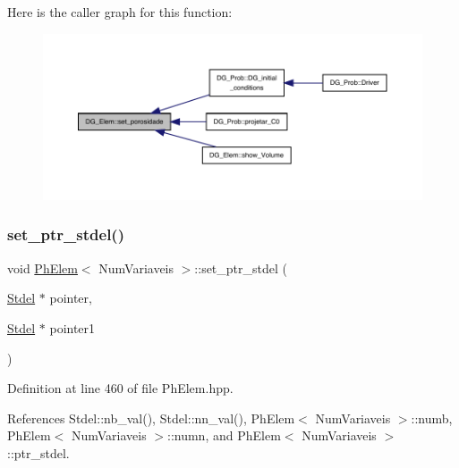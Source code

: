 Here is the caller graph for this function\+:
\nopagebreak
\begin{figure}[H]
\begin{center}
\leavevmode
\includegraphics[width=350pt]{classDG__Elem_a5d8512886cb22395c92265f5eee6a940_icgraph}
\end{center}
\end{figure}
\mbox{\label{classPhElem_af2796c868709214bb9b151b47d7d471f}} 
\subsubsection{\texorpdfstring{set\+\_\+ptr\+\_\+stdel()}{set\_ptr\_stdel()}\hspace{0.1cm}{\footnotesize\ttfamily [1/3]}}
{\footnotesize\ttfamily void \hyperlink{classPhElem}{Ph\+Elem}$<$ Num\+Variaveis $>$\+::set\+\_\+ptr\+\_\+stdel (\begin{DoxyParamCaption}\item[{\hyperlink{classStdel}{Stdel} $\ast$}]{pointer,  }\item[{\hyperlink{classStdel}{Stdel} $\ast$}]{pointer1 }\end{DoxyParamCaption})\hspace{0.3cm}{\ttfamily [inherited]}}



Definition at line 460 of file Ph\+Elem.\+hpp.



References Stdel\+::nb\+\_\+val(), Stdel\+::nn\+\_\+val(), Ph\+Elem$<$ Num\+Variaveis $>$\+::numb, Ph\+Elem$<$ Num\+Variaveis $>$\+::numn, and Ph\+Elem$<$ Num\+Variaveis $>$\+::ptr\+\_\+stdel.

\mbox{\label{classPhElem_aaf841c14455a54e0f33e2c74bef979fd}} 
